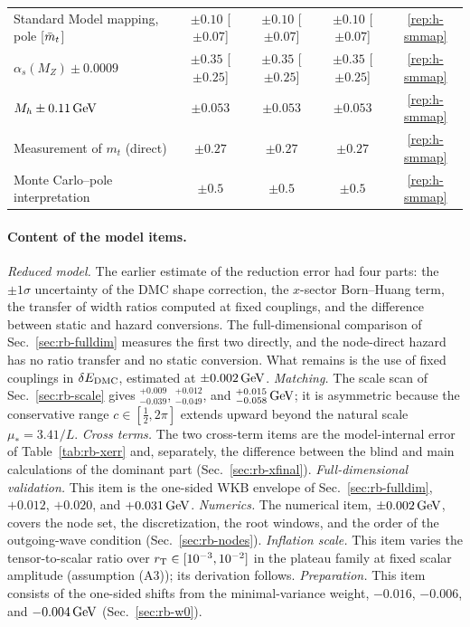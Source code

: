 \begin{table}[t]
\begin{tabular}{lcccc}
\midrule
Standard Model mapping, pole [$\bar m_t$] & $\pm0.10$ [$\pm0.07$] & $\pm0.10$ [$\pm0.07$] & $\pm0.10$ [$\pm0.07$] & \ref{rep:h-smmap} \\ %
$\alpha_s(M_Z)\pm0.0009$ & $\pm0.35$ [$\pm0.25$] & $\pm0.35$ [$\pm0.25$] & $\pm0.35$ [$\pm0.25$] & \ref{rep:h-smmap} \\ %
$M_h\pm0.11\,\mathrm{GeV}$ & $\pm0.053$ & $\pm0.053$ & $\pm0.053$ & \ref{rep:h-smmap} \\ %
Measurement of $m_t$ (direct) & $\pm0.27$ & $\pm0.27$ & $\pm0.27$ & \ref{rep:h-smmap} \\ %
Monte Carlo--pole interpretation & $\pm0.5$ & $\pm0.5$ & $\pm0.5$ & \ref{rep:h-smmap} \\ %
\bottomrule
\end{tabular}
\end{table}

\paragraph{Content of the model items.}
\emph{Reduced model.}
The earlier estimate of the reduction error had four parts: the $\pm1\sigma$ uncertainty of the DMC shape correction, the $x$-sector Born--Huang term, the transfer of width ratios computed at fixed couplings, and the difference between static and hazard conversions.
The full-dimensional comparison of Sec.~\ref{sec:rb-fulldim} measures the first two directly, and the node-direct hazard has no ratio transfer and no static conversion.
What remains is the use of fixed couplings in $\delta E_{\rm DMC}$, estimated at $\pm0.002\,\mathrm{GeV}$. %
\emph{Matching.}
The scale scan of Sec.~\ref{sec:rb-scale} gives $^{+0.009}_{-0.039}$, $^{+0.012}_{-0.049}$, and $^{+0.015}_{-0.058}\,\mathrm{GeV}$; it is asymmetric because the conservative range $c\in[\frac12,2\pi]$ extends upward beyond the natural scale $\mu_*=3.41/L$. %
\emph{Cross terms.}
The two cross-term items are the model-internal error of Table~\ref{tab:rb-xerr} and, separately, the difference between the blind and main calculations of the dominant part (Sec.~\ref{sec:rb-xfinal}).
\emph{Full-dimensional validation.}
This item is the one-sided WKB envelope of Sec.~\ref{sec:rb-fulldim}, $+0.012$, $+0.020$, and $+0.031\,\mathrm{GeV}$. %
\emph{Numerics.}
The numerical item, $\pm0.002\,\mathrm{GeV}$, covers the node set, the discretization, the root windows, and the order of the outgoing-wave condition (Sec.~\ref{sec:rb-nodes}). %
\emph{Inflation scale.}
This item varies the tensor-to-scalar ratio over $r_{\mathrm{T}}\in[10^{-3},10^{-2}]$ in the plateau family at fixed scalar amplitude (assumption (A3)); its derivation follows. %
\emph{Preparation.}
This item consists of the one-sided shifts from the minimal-variance weight, $-0.016$, $-0.006$, and $-0.004\,\mathrm{GeV}$ (Sec.~\ref{sec:rb-w0}). %

